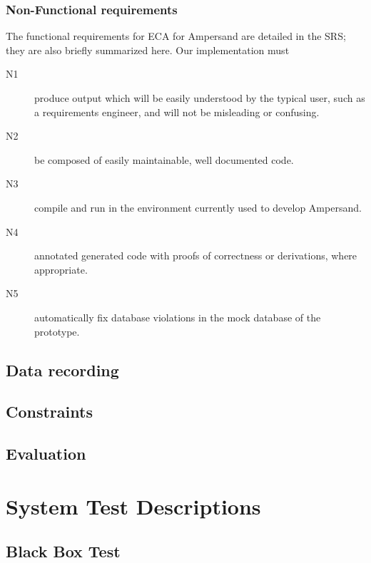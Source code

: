 \documentclass[12pt]{report}
\begin{document}
\subsection{Non-Functional requirements}
The functional requirements for ECA for Ampersand are detailed in the SRS; they
are also briefly summarized here. Our implementation must

\begin{description}
\item[N1] produce output which will be easily understood by the typical user,
  such as a requirements engineer, and will not be misleading or confusing.  
\item[N2] be composed of easily maintainable, well documented code.
\item[N3] compile and run in the environment currently used to develop
  Ampersand.
\item[N4] annotated generated code with proofs of correctness or derivations,
  where appropriate. 
\item[N5] automatically fix database violations in the mock database of the
  prototype. 
\end{description}

\section{Data recording}
\section{Constraints}
\section{Evaluation}


\chapter{System Test Descriptions}
\section{Black Box Test} 
\end{document}

